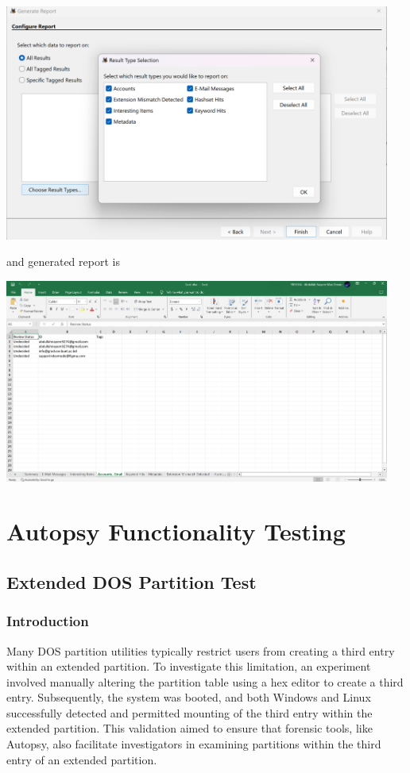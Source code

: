 \documentclass{article}
\begin{document}
\begin{center}
    \includegraphics[width=0.95\textwidth]{5/5.3/Report Generation-2 .png}
\end{center}
and generated report is 
\begin{center}
    \includegraphics[width=0.95\textwidth]{5/5.3/Report Generation-3.png}
\end{center}

\section{Autopsy Functionality Testing}
\subsection{Extended DOS Partition Test}
\subsubsection*{Introduction}
Many DOS partition utilities typically restrict users from creating a third entry within an extended partition. To investigate this limitation, an experiment involved manually altering the partition table using a hex editor to create a third entry. Subsequently, the system was booted, and both Windows and Linux successfully detected and permitted mounting of the third entry within the extended partition. This validation aimed to ensure that forensic tools, like Autopsy, also facilitate investigators in examining partitions within the third entry of an extended partition.
\end{document}
